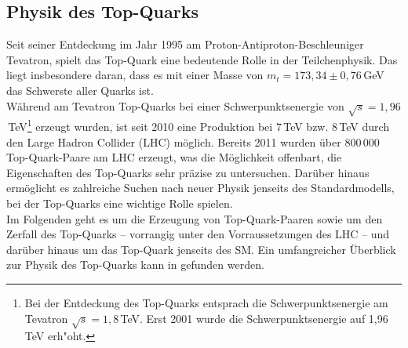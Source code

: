 \subsection{Physik des Top-Quarks}
\label{kaptop}
Seit seiner Entdeckung im Jahr 1995 am Proton-Antiproton-Beschleuniger Tevatron, spielt das Top-Quark eine bedeutende Rolle in der Teilchenphysik. Das liegt insbesondere daran, dass es mit einer Masse von $m_{t}=173,34\pm 0,76$\,GeV \cite{ATLAS:2014wva} das Schwerste aller Quarks ist.\\
W\"ahrend am Tevatron Top-Quarks bei einer Schwerpunkts\-energie von $\sqrt{s}=1,96$\,TeV\footnote{Bei der Entdeckung des Top-Quarks entsprach die Schwerpunkts\-energie am Tevatron $\sqrt{s}=1,8$\,TeV. Erst 2001 wurde die Schwerpunkts\-energie auf 1,96\,TeV erh"oht.} erzeugt wurden, ist seit 2010 eine Produktion bei 7\,TeV bzw. 8\,TeV durch den Large Hadron Collider (LHC) m\"oglich. Bereits 2011 wurden über 800\,000 Top-Quark-Paare am LHC erzeugt, was die M\"oglichkeit offenbart, die Eigenschaften des Top-Quarks sehr pr\"azise zu untersuchen. Dar\"uber hinaus erm\"oglicht es zahlreiche Suchen nach neuer Physik jenseits des Standardmodells, bei der Top-Quarks eine wichtige Rolle spielen.\\
Im Folgenden geht es um die Erzeugung von Top-Quark-Paaren sowie um den Zerfall des Top-Quarks -- vorrangig unter den Vorraussetzungen des LHC -- und dar\"uber hinaus um das Top-Quark jenseits des SM. Ein umfangreicher \"Uberblick zur Physik des Top-Quarks kann in \cite{Bernreuther, Schilling} gefunden werden.


